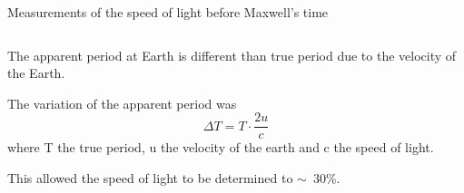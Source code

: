 \begin{frame}{Measurements of the speed of light before Maxwell's time}
\begin{columns}
\begin{column}{0.67\textwidth}
      \begin{itemize}
      {\small
        \item The apparent period at Earth is different than true period due to the velocity of the Earth.
        \item The variation of the apparent period was
                  \begin{equation*}
                        {\Delta}T = T \cdot \frac{2u}{c}
                  \end{equation*}
                  where T the true period, u the velocity of the earth and c the speed of light.
        \item This allowed the speed of light to be determined to $\sim$~30\%.\\
      }
      \end{itemize}
  \end{column}
\end{columns}

\end{frame}

%
%
%
%

